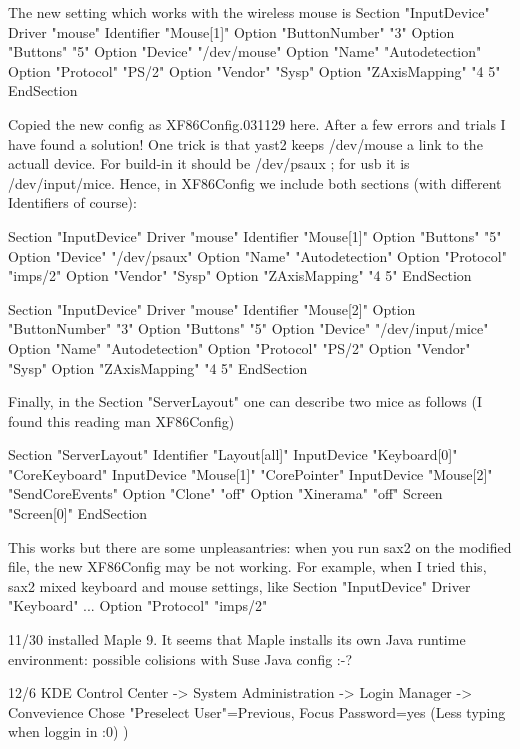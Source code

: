 The new setting which works with the wireless mouse is
Section "InputDevice"
  Driver       "mouse"
  Identifier   "Mouse[1]"
  Option       "ButtonNumber" "3"
  Option       "Buttons" "5"
  Option       "Device" "/dev/mouse"
  Option       "Name" "Autodetection"
  Option       "Protocol" "PS/2"
  Option       "Vendor" "Sysp"
  Option       "ZAxisMapping" "4 5"
EndSection

Copied the new config as XF86Config.031129 here. After a few errors and trials
I have found a solution! One trick is that yast2 keeps /dev/mouse a link
to the actuall device. For build-in it should be /dev/psaux ; for usb it is
/dev/input/mice. Hence, in XF86Config we include both sections (with different
Identifiers of course):

Section "InputDevice"
  Driver       "mouse"
  Identifier   "Mouse[1]"
  Option       "Buttons" "5"
  Option       "Device" "/dev/psaux"
  Option       "Name" "Autodetection"
  Option       "Protocol" "imps/2"
  Option       "Vendor" "Sysp"
  Option       "ZAxisMapping" "4 5"
EndSection

Section "InputDevice"
  Driver       "mouse"
  Identifier   "Mouse[2]"
  Option       "ButtonNumber" "3"
  Option       "Buttons" "5"
  Option       "Device" "/dev/input/mice"
  Option       "Name" "Autodetection"
  Option       "Protocol" "PS/2"
  Option       "Vendor" "Sysp"
  Option       "ZAxisMapping" "4 5"
EndSection

Finally, in the Section "ServerLayout" one can describe two mice as follows
(I found this reading man XF86Config)

Section "ServerLayout"
  Identifier   "Layout[all]"
  InputDevice  "Keyboard[0]" "CoreKeyboard"
  InputDevice  "Mouse[1]" "CorePointer"
  InputDevice  "Mouse[2]" "SendCoreEvents"
  Option       "Clone" "off"
  Option       "Xinerama" "off"
  Screen       "Screen[0]"
EndSection

This works but there are some unpleasantries: when you run sax2 on the
modified file, the new XF86Config may be not working. For
example, when I tried this, sax2 mixed keyboard and mouse settings, like
 Section "InputDevice"
   Driver "Keyboard"
   ...
   Option "Protocol" "imps/2"

11/30
 installed Maple 9. It seems that Maple installs its own Java runtime
environment: possible colisions with Suse Java config :-?

12/6
 KDE Control Center -> System Administration -> Login Manager -> Convevience
 Chose "Preselect User"=Previous, Focus Password=yes
 (Less typing when loggin in :0) )

